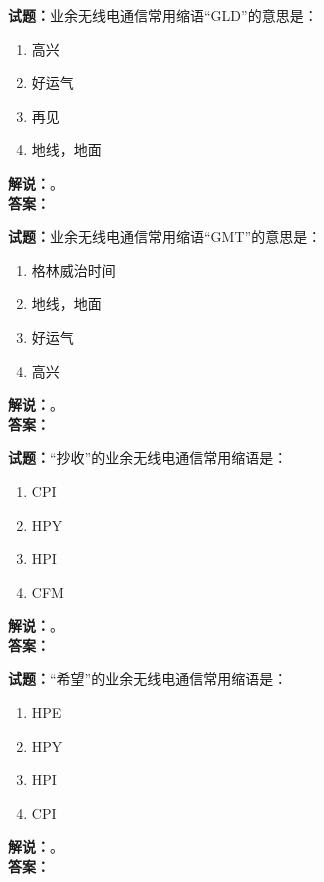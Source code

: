 \documentclass{ctexbook}
\begin{document}
\bigskip




\noindent\textbf{试题：}业余无线电通信常用缩语“GLD”的意思是：
\begin{enumerate}[leftmargin=3em]
\item 高兴
\item 好运气
\item 再见
\item 地线，地面
\end{enumerate}
\noindent\textbf{解说：}\textbf{}。\\\noindent\textbf{答案：}

\bigskip




\noindent\textbf{试题：}业余无线电通信常用缩语“GMT”的意思是：
\begin{enumerate}[leftmargin=3em]
\item 格林威治时间
\item 地线，地面
\item 好运气
\item 高兴
\end{enumerate}
\noindent\textbf{解说：}\textbf{}。\\\noindent\textbf{答案：}

\bigskip




\noindent\textbf{试题：}“抄收”的业余无线电通信常用缩语是：
\begin{enumerate}[leftmargin=3em]
\item CPI
\item HPY
\item HPI
\item CFM
\end{enumerate}
\noindent\textbf{解说：}\textbf{}。\\\noindent\textbf{答案：}

\bigskip




\noindent\textbf{试题：}“希望”的业余无线电通信常用缩语是：
\begin{enumerate}[leftmargin=3em]
\item HPE
\item HPY
\item HPI
\item CPI
\end{enumerate}
\noindent\textbf{解说：}\textbf{}。\\\noindent\textbf{答案：}

\bigskip
\end{document}
